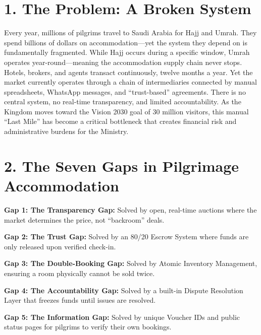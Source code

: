 \documentclass[11pt,a4paper]{article}
\begin{document}
\vspace{1cm}

\section*{1. The Problem: A Broken System}


Every year, millions of pilgrims travel to Saudi Arabia for Hajj and Umrah. They spend billions of dollars on accommodation---yet the system they depend on is fundamentally fragmented. While Hajj occurs during a specific window, Umrah operates year-round---meaning the accommodation supply chain never stops. Hotels, brokers, and agents transact continuously, twelve months a year. Yet the market currently operates through a chain of intermediaries connected by manual spreadsheets, WhatsApp messages, and ``trust-based'' agreements. There is no central system, no real-time transparency, and limited accountability. As the Kingdom moves toward the Vision 2030 goal of 30 million visitors, this manual ``Last Mile'' has become a critical bottleneck that creates financial risk and administrative burdens for the Ministry.


\section*{2. The Seven Gaps in Pilgrimage Accommodation}

\textbf{Gap 1: The Transparency Gap:} Solved by open, real-time auctions where the market determines the price, not ``backroom'' deals.

\vspace{0.3cm}

\textbf{Gap 2: The Trust Gap:} Solved by an 80/20 Escrow System where funds are only released upon verified check-in.

\vspace{0.3cm}

\textbf{Gap 3: The Double-Booking Gap:} Solved by Atomic Inventory Management, ensuring a room physically cannot be sold twice.

\vspace{0.3cm}

\textbf{Gap 4: The Accountability Gap:} Solved by a built-in Dispute Resolution Layer that freezes funds until issues are resolved.

\vspace{0.3cm}

\textbf{Gap 5: The Information Gap:} Solved by unique Voucher IDs and public status pages for pilgrims to verify their own bookings.
\end{document}
